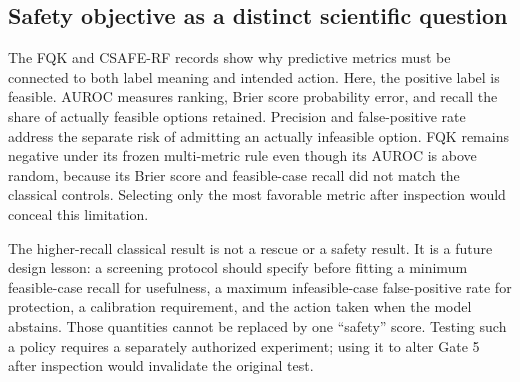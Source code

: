 \subsection{Safety objective as a distinct scientific question}

The FQK and CSAFE-RF records show why predictive metrics must be connected to
both label meaning and intended action. Here, the positive label is feasible.
AUROC measures ranking, Brier score probability error, and recall the share of
actually feasible options retained. Precision and false-positive rate address
the separate risk of admitting an actually infeasible option. FQK remains
negative under its frozen multi-metric rule even though its AUROC is above
random, because its Brier score and feasible-case recall did not match the
classical controls. Selecting only the most favorable metric after inspection
would conceal this limitation.

The higher-recall classical result is not a rescue or a safety result. It is a
future design lesson: a screening protocol should specify before fitting a
minimum feasible-case recall for usefulness, a maximum infeasible-case
false-positive rate for protection, a calibration requirement, and the action
taken when the model abstains. Those quantities cannot be replaced by one
``safety'' score. Testing such a policy requires a separately authorized
experiment; using it to alter Gate 5 after inspection would invalidate the
original test.
